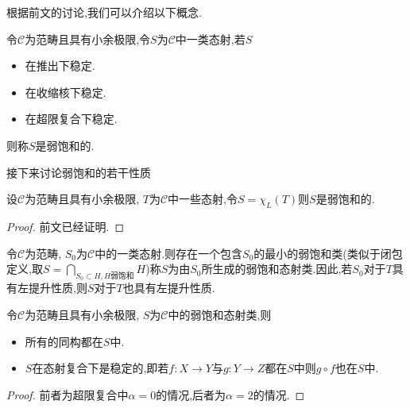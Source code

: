 根据前文的讨论,我们可以介绍以下概念.
\begin{definition}[弱饱和]
    令$\mathcal{C}$为范畴且具有小余极限,令$S$为$\mathcal{C}$中一类态射,若$S$
    \begin{itemize}
        \item 在推出下稳定.
        \item 在收缩核下稳定.
        \item 在超限复合下稳定.
    \end{itemize}
    则称$S$是弱饱和的.
\end{definition}

接下来讨论弱饱和的若干性质
\begin{proposition}
    设$\mathcal{C}$为范畴且具有小余极限, $T$为$\mathcal{C}$中一些态射,令$S = \chi_L(T)$则$S$是弱饱和的.
\end{proposition}
\begin{proof}
    前文已经证明.
\end{proof}
\begin{remark}
    令$\mathcal{C}$为范畴, $S_0$为$\mathcal{C}$中的一类态射.则存在一个包含$S_0$的最小的弱饱和类(类似于闭包定义,取$S = \bigcap_{S_0 \subset H,H\text{弱饱和}}H$)称$S$为由$S_0$所生成的弱饱和态射类.因此,若$S_0$对于$T$具有左提升性质,则$S$对于$T$也具有左提升性质.
\end{remark}
\begin{proposition}
    令$\mathcal{C}$为范畴且具有小余极限, $S$为$\mathcal{C}$中的弱饱和态射类,则
    \begin{itemize}
        \item 所有的同构都在$S$中.
        \item $S$在态射复合下是稳定的,即若$f:X \to Y$与$g : Y \to Z$都在$S$中则$g\circ f$也在$S$中.
    \end{itemize}
\end{proposition}
\begin{proof}    
    前者为超限复合中$\alpha = 0$的情况,后者为$\alpha = 2$的情况.
\end{proof}
